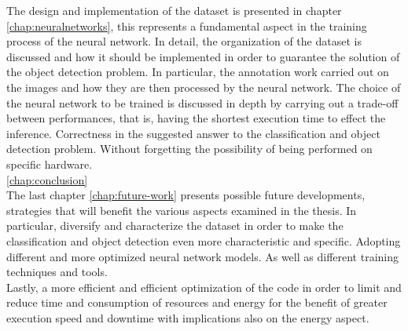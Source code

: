 \noindent The design and implementation of the dataset is presented in chapter
\ref{chap:neuralnetworks}, this represents a fundamental aspect in the training
process of the neural network.
In detail, the organization of the dataset is discussed and how it should be
implemented in order to guarantee the solution of the object detection problem.
In particular, the annotation work carried out on the images and how they are
then processed by the neural network.
The choice of the neural network to be trained is discussed in depth by carrying
out a trade-off between performances, that is, having the shortest execution
time to effect the inference. 
Correctness in the suggested answer to the classification and object detection
problem. 
Without forgetting the possibility of being performed on specific hardware.\\


\ref{chap:conclusion}\\



\noindent The last chapter \ref{chap:future-work} presents possible future
developments, strategies that will benefit the various aspects examined in the
thesis.
In particular, diversify and characterize the dataset in order to make the
classification and object detection even more characteristic and specific.
Adopting different and more optimized neural network models. 
As well as different training techniques and tools.\\ 
Lastly, a more efficient and efficient optimization of the code in order to
limit and reduce time and consumption of resources and energy for the benefit of
greater execution speed and downtime with implications also on the energy
aspect.